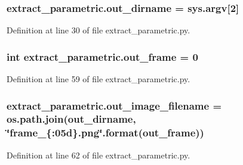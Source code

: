 \subsubsection[{\texorpdfstring{out\+\_\+dirname}{out_dirname}}]{\setlength{\rightskip}{0pt plus 5cm}extract\+\_\+parametric.\+out\+\_\+dirname = sys.\+argv\mbox{[}2\mbox{]}}\hypertarget{namespaceextract__parametric_adf9a3c8f1bd35b8eaa0aab6093f1d2ef}{}\label{namespaceextract__parametric_adf9a3c8f1bd35b8eaa0aab6093f1d2ef}


Definition at line 30 of file extract\+\_\+parametric.\+py.

\subsubsection[{\texorpdfstring{out\+\_\+frame}{out_frame}}]{\setlength{\rightskip}{0pt plus 5cm}int extract\+\_\+parametric.\+out\+\_\+frame = 0}\hypertarget{namespaceextract__parametric_a073b7ebc2ff68e243f2c5ea8b1c6061d}{}\label{namespaceextract__parametric_a073b7ebc2ff68e243f2c5ea8b1c6061d}


Definition at line 59 of file extract\+\_\+parametric.\+py.

\subsubsection[{\texorpdfstring{out\+\_\+image\+\_\+filename}{out_image_filename}}]{\setlength{\rightskip}{0pt plus 5cm}extract\+\_\+parametric.\+out\+\_\+image\+\_\+filename = os.\+path.\+join({\bf out\+\_\+dirname}, \char`\"{}frame\+\_\+\{\+:05d\}.\+png\char`\"{}.\+format(out\+\_\+frame))}\hypertarget{namespaceextract__parametric_a65e8dff0853e3524cad91838fcc80520}{}\label{namespaceextract__parametric_a65e8dff0853e3524cad91838fcc80520}


Definition at line 62 of file extract\+\_\+parametric.\+py.

